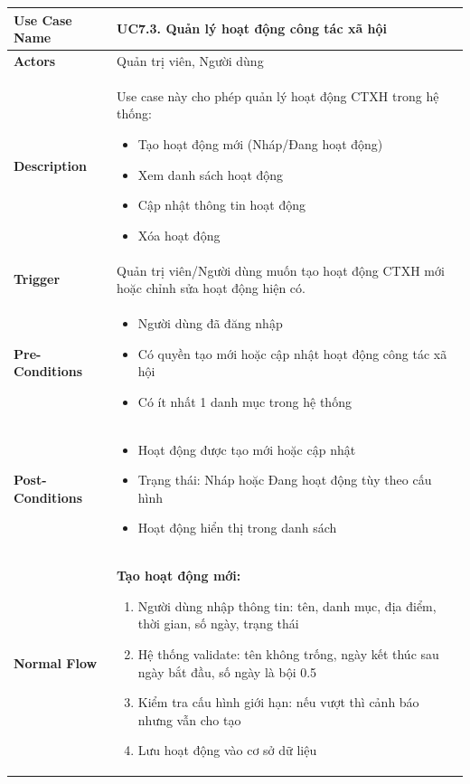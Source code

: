     \newpage
    \begin{table}[H]
    \renewcommand{\arraystretch}{1.3}
    \begin{tabular}{|m{}|m{}|}
    \hline
    \textbf{Use Case Name} 
    & \textbf{UC7.3. Quản lý hoạt động công tác xã hội} \\ \hline

\textbf{Actors} 
& Quản trị viên, Người dùng \\ \hline

\textbf{Description} 
    & Use case này cho phép quản lý hoạt động CTXH trong hệ thống:
    \begin{itemize}
        \item Tạo hoạt động mới (Nháp/Đang hoạt động)
        \item Xem danh sách hoạt động
        \item Cập nhật thông tin hoạt động
        \item Xóa hoạt động
    \end{itemize}
    \\ \hline

    \textbf{Trigger} 
    & Quản trị viên/Người dùng muốn tạo hoạt động CTXH mới hoặc chỉnh sửa hoạt động hiện có.
    \\ \hline

    \textbf{Pre-Conditions} 
    & \begin{itemize}
        \item Người dùng đã đăng nhập
        \item Có quyền tạo mới hoặc cập nhật hoạt động công tác xã hội
        \item Có ít nhất 1 danh mục trong hệ thống
    \end{itemize}
    \\ \hline

    \textbf{Post-Conditions} 
    & \begin{itemize}
        \item Hoạt động được tạo mới hoặc cập nhật
        \item Trạng thái: Nháp hoặc Đang hoạt động tùy theo cấu hình
        \item Hoạt động hiển thị trong danh sách
    \end{itemize}
    \\ \hline

    \textbf{Normal Flow} 
    & \textbf{Tạo hoạt động mới:}
    \begin{enumerate}
        \item Người dùng nhập thông tin: tên, danh mục, địa điểm, thời gian, số ngày, trạng thái
        \item Hệ thống validate: tên không trống, ngày kết thúc sau ngày bắt đầu, số ngày là bội 0.5
        \item Kiểm tra cấu hình giới hạn: nếu vượt thì cảnh báo nhưng vẫn cho tạo
        \item Lưu hoạt động vào cơ sở dữ liệu
    \end{enumerate}


\end{tabular}
\end{table}
